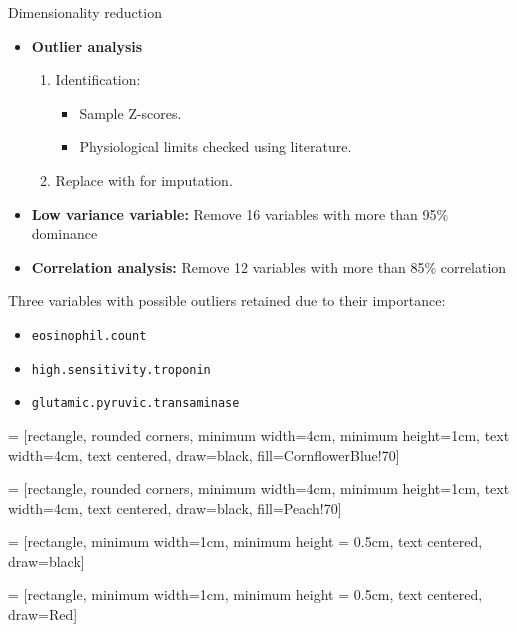 \documentclass[aspectratio=169,xcolor=dvipsnames,handout]{beamer}
\begin{document}

\begin{frame}{Dimensionality reduction}
\begin{itemize}
    \item \textbf{Outlier analysis}
    \begin{enumerate}
        \item Identification:
            \begin{itemize}
                \item Sample Z-scores.
                \item Physiological limits checked using literature.
            \end{itemize}
        \item Replace with  for imputation.
    \end{enumerate}

    \item \textbf{Low variance variable:}
    Remove \alert{16} variables with more than \alert{95\% dominance}

    \item \textbf{Correlation analysis:}
    Remove \alert{12} variables with more than \alert{85\% correlation}
\end{itemize}

Three variables with possible outliers retained due to their importance:
\begin{itemize}
    \item \texttt{eosinophil.count}
    \item \texttt{high.sensitivity.troponin}
    \item \texttt{glutamic.pyruvic.transaminase}
\end{itemize}

\end{frame}
 = [rectangle, rounded corners, 
minimum width=4cm, 
minimum height=1cm,
text width=4cm,
text centered, 
draw=black, 
fill=CornflowerBlue!70]

 = [rectangle, rounded corners, 
minimum width=4cm, 
minimum height=1cm,
text width=4cm,
text centered, 
draw=black, 
fill=Peach!70]

 = [rectangle, 
minimum width=1cm, 
minimum height = 0.5cm,
text centered, 
draw=black]

 = [rectangle, 
minimum width=1cm, 
minimum height = 0.5cm,
text centered, 
draw=Red]
\end{document}
